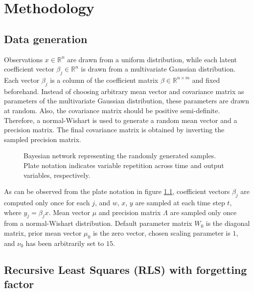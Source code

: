 \chapter{Methodology}

\section{Data generation}

  Observations $x \in \mathbb{R}^n$ are drawn from a uniform distribution,
  while each latent coefficient vector $\beta_j \in \mathbb{R}^n$
  is drawn from a multivariate Gaussian distribution.
  Each vector $\beta_j$ is a column of the coefficient
  matrix $\beta \in \mathbb{R}^{n \times m}$ and fixed beforehand.
  Instead of choosing arbitrary mean vector and covariance
  matrix as parameters of the multivariate Gaussian distribution,
  these parameters are drawn at random. Also, the covariance matrix
  should be positive semi-definite. Therefore, a normal-Wishart
  is used to generate a random mean vector and a precision matrix.
  The final covariance matrix is obtained by inverting the sampled
  precision matrix.

  \begin{figure}[ht]
    \begin{center}
      \resizebox{.85\textwidth}{!}{
        
      }
    \end{center}
    \caption{Bayesian network representing the randomly generated samples.
        Plate notation indicates variable repetition across time and
        output variables, respectively.}
    \label{bayesnet}
  \end{figure}

  As can be observed from the plate notation in figure \ref{bayesnet},
  coefficient vectors $\beta_j$ are computed only once for each $j$,
  and $w$, $x$, $y$ are sampled at each time step $t$, where $y_j = \beta_j x$.
  Mean vector $\mu$ and precision matrix $\Lambda$ are sampled only once
  from a normal-Wishart distribution.
  Default parameter matrix $W_0$ is the diagonal matrix, prior mean vector $\mu_0$
  is the zero vector, chosen scaling parameter is $1$, and $\nu_0$ has been
  arbitrarily set to $15$.


\section{Recursive Least Squares (RLS) with forgetting factor}

